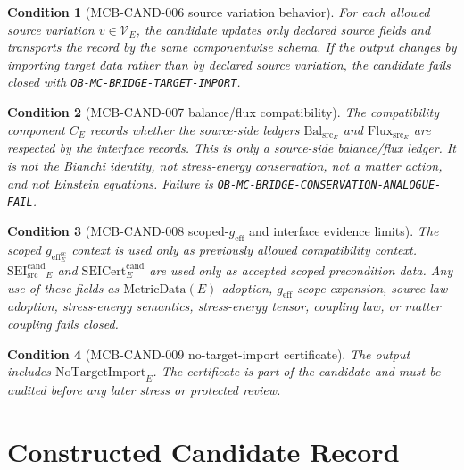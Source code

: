 \documentclass[11pt]{article}
\newcommand{\MetricData}{\mathrm{MetricData}}
\newcommand{\geff}{g_{\mathrm{eff}}}
\newcommand{\SEICand}{\mathrm{SEI}_{\mathrm{src}}^{\mathrm{cand}}}
\newcommand{\SEICertCand}{\mathrm{SEICert}^{\mathrm{cand}}}
\newcommand{\NoTargetImport}{\mathrm{NoTargetImport}}
\newcommand{\BalSrc}{\mathrm{Bal}_{\mathrm{src}}}
\newcommand{\FluxSrc}{\mathrm{Flux}_{\mathrm{src}}}
\newtheorem{condition}{Condition}
\begin{document}
\begin{condition}[MCB-CAND-006 source variation behavior]
For each allowed source variation \(v\in\mathcal{V}_E\), the candidate
updates only declared source fields and transports the record by the same
componentwise schema. If the output changes by importing target data rather
than by declared source variation, the candidate fails closed with
\texttt{OB-MC-BRIDGE-TARGET-IMPORT}.
\end{condition}

\begin{condition}[MCB-CAND-007 balance/flux compatibility]
The compatibility component \(C_E\) records whether the source-side ledgers
\(\BalSrc_E\) and \(\FluxSrc_E\) are respected by the interface records.
This is only a source-side balance/flux ledger. It is not the Bianchi
identity, not stress-energy conservation, not a matter action, and not
Einstein equations. Failure is
\texttt{OB-MC-BRIDGE-CONSERVATION-ANALOGUE-FAIL}.
\end{condition}

\begin{condition}[MCB-CAND-008 scoped-\(\geff\) and interface evidence limits]
The scoped \(\geff_E^{\mathrm{sc}}\) context is used only as previously
allowed compatibility context. \(\SEICand_E\) and \(\SEICertCand_E\) are used
only as accepted scoped precondition data. Any use of these fields as
\(\MetricData(E)\) adoption, \(\geff\) scope expansion, source-law adoption,
stress-energy semantics, stress-energy tensor, coupling law, or matter
coupling fails closed.
\end{condition}

\begin{condition}[MCB-CAND-009 no-target-import certificate]
The output includes \(\NoTargetImport_E\). The certificate is part of the
candidate and must be audited before any later stress or protected review.
\end{condition}

\section{Constructed Candidate Record}
\end{document}
